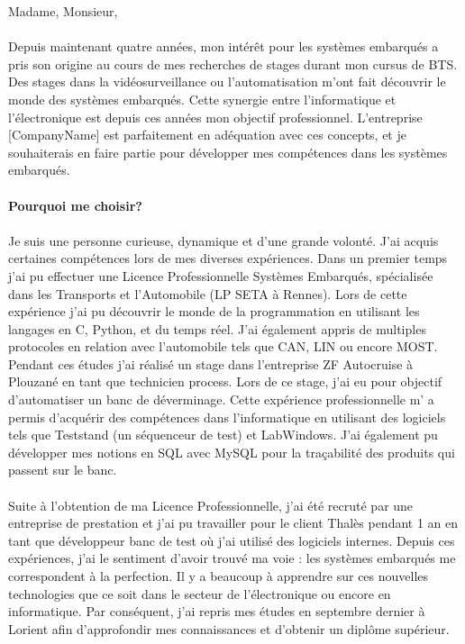 \documentclass[a4paper,11pt]{article}
\begin{document}
\fancyfoot{}
\pagestyle{fancy}
Madame, Monsieur,
\\\\
Depuis maintenant quatre années, mon intérêt pour les systèmes embarqués a pris son origine au cours de mes recherches de stages durant mon cursus de BTS. Des stages dans la vidéosurveillance ou l’automatisation m’ont fait découvrir le monde des systèmes embarqués. Cette synergie entre l’informatique et l’électronique est depuis ces années mon objectif professionnel. L’entreprise [CompanyName] est parfaitement en adéquation avec ces concepts, et je souhaiterais en faire partie pour développer mes compétences dans les systèmes embarqués.
\\\\
\textbf{Pourquoi me choisir?} 
\\\\
Je suis une personne curieuse, dynamique et d’une grande volonté. J’ai acquis certaines compétences lors de mes diverses expériences. Dans un premier temps j’ai pu effectuer une Licence Professionnelle Systèmes Embarqués, spécialisée dans les Transports et l’Automobile (LP SETA à Rennes). Lors de cette expérience j’ai pu découvrir le monde de la programmation en utilisant les langages en C, Python, et du temps réel. J’ai également appris de multiples protocoles en relation avec l’automobile tels que CAN, LIN ou encore MOST. Pendant ces études j’ai réalisé un stage dans l’entreprise ZF Autocruise à Plouzané en tant que technicien process. Lors de ce stage, j’ai eu pour objectif d’automatiser un banc de déverminage. Cette expérience professionnelle m' a permis d'acquérir des compétences dans l’informatique en utilisant des logiciels tels que Teststand (un séquenceur de test) et LabWindows. J’ai également pu développer mes notions en SQL avec MySQL pour la traçabilité des produits qui passent sur le banc. 
\\\\
Suite à l’obtention de ma Licence Professionnelle, j’ai été recruté par une entreprise de prestation et j’ai pu travailler pour le client Thalès pendant 1 an en tant que développeur banc de test où j’ai utilisé des logiciels internes. Depuis ces expériences, j’ai le sentiment d’avoir trouvé ma voie : les systèmes embarqués me correspondent à la perfection. Il y a beaucoup à apprendre sur ces nouvelles technologies que ce soit dans le secteur de l’électronique ou encore en informatique. Par conséquent, j'ai repris mes études en septembre dernier à Lorient afin d'approfondir mes connaissances et d'obtenir un diplôme supérieur. 
\end{document}
